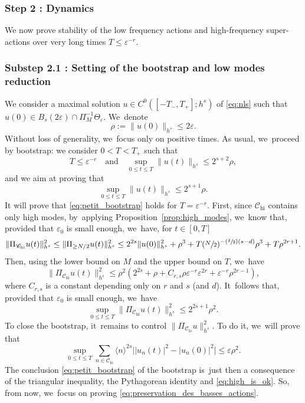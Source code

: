 \documentclass[JEP,XML,SOM,Unicode,published]{cedram}
\newcommand{\Psfrac}[2]{(\sfrac{#1}{#2})}
\theoremstyle{plain}
\theoremstyle{definition}
\DeclareMathOperator{\hi}{hi}
\DeclareMathOperator{\lo}{lo}
\newcommand{\1}{\mathbf{1}}
\newcommand{\Clo}{\mathscr{C}_{\lo}}
\newcommand{\Chigh}{\mathscr{C}_{\hi}}
\let\epsilon\varepsilon
\begin{document}
\subsubsection*{Step 2 : Dynamics}
We now prove stability of the low frequency actions and high-frequency super-actions over very long times $T\leq \epsilon^{-r}$.

\subsubsection*{Substep 2.1 : Setting of the bootstrap and low modes reduction}
We consider a maximal solution $u\in C^0([-T_-,T_+];h^s)$ of \eqref{eq:nls} such that $u(0) \in B_s(2\varepsilon) \cap \Pi_M^{-1}\Theta_\varepsilon$. We~denote
\[
\rho := \|u(0) \|_{h^s} \leq 2\varepsilon.
\]
Without loss of generality, we~focus only on positive times. As usual, we~proceed by bootstrap: we consider $0<T<T_+$ such that
\[
T\leq \varepsilon^{-r} \quad \mathrm{and} \quad \sup_{0\leq t \leq T} \| u(t) \|_{h^s} \leq 2^{s+2} \rho,
\]
and we aim at proving that
\begin{equation}
\label{eq:petit_bootstrap}
\sup_{0\leq t \leq T} \| u(t) \|_{h^s} \leq 2^{s+1} \rho.
\end{equation}
It will prove that \eqref{eq:petit_bootstrap} holds for $T=\varepsilon^{-r}$. First, since $\Chigh$ contains only high modes, by~applying Proposition~\ref{prop:high_modes}, we~know that, provided that $\varepsilon_0$ is small enough, we~have, for $t\in [0,T]$
\[
\| \Pi_{\Chigh} u(t) \|_{h^s}^2 \leq \| \Pi_{\geq N/2} u(t) \|_{h^s}^2 \leq 2^{2s} \| u(0) \|_{h^s}^2 + \rho^3 + T(\sfrac{N}2)^{-\Psfrac{\delta}{2}(s-d)} \rho^{3}+T \rho^{2r+1}.
\]
Then, using the lower bound on $M$ and the upper bound on $T$, we~have
\[
\| \Pi_{\Chigh} u(t) \|_{h^s}^2 \leq \rho^2 (2^{2s} + \rho + C_{r,s}\rho \varepsilon^{-r} \varepsilon^{2r}+ \varepsilon^{-r} \rho^{2r-1}),
\]
where $C_{r,s}$ is a constant depending only on $r$ and $s$ (and $d$). It~follows that, provided that $\varepsilon_0$ is small enough, we~have
\begin{equation}
\label{eq:high_is_ok}
\sup_{0\leq t \leq T} \| \Pi_{\Chigh} u(t) \|_{h^s}^2 \leq 2^{2s+1} \rho^2.
\end{equation}
To close the bootstrap, it~remains to control $ \| \Pi_{\Clo} u \|_{h^s}^2$. To do it, we~will prove that
\begin{equation}
\label{eq:preservation_des_basses_actions}
\sup_{0\leq t \leq T} \sum_{n\in \Clo} \langle n\rangle^{2s} \big| |u_n(t)|^2 - |u_n(0)|^2 \big|\leq \varepsilon \rho^2.
\end{equation}
The conclusion \eqref{eq:petit_bootstrap} of the bootstrap is~just then a consequence of the triangular inequality, the Pythagorean identity and \eqref{eq:high_is_ok}. So, from now, we~focus on proving \eqref{eq:preservation_des_basses_actions}.
\end{document}
